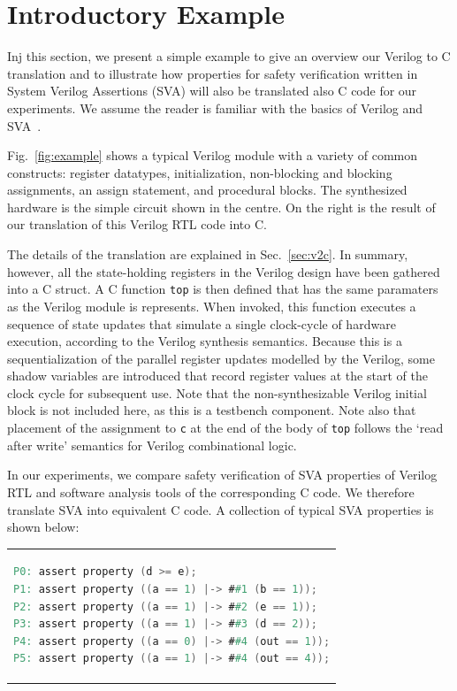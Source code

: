 \section{Introductory Example} 

Inj this section, we present a simple example to give an overview our Verilog to C translation and to illustrate how properties for safety verification written in System Verilog Assertions (SVA) will also be translated also C code for our experiments. We assume the reader is familiar with the basics of Verilog and SVA~\cite{verilog}. 

Fig.~\ref{fig:example} shows a typical Verilog module with a variety of common constructs: register datatypes, initialization, non-blocking and blocking assignments, an assign statement, and procedural blocks.  The synthesized hardware is the simple circuit shown in the centre.  On the right is the result of our translation of this Verilog RTL code into C.

The details of the translation are explained in Sec.~\ref{sec:v2c}. In summary, however, all the state-holding registers in the Verilog design have been gathered into a C struct. A C function \texttt{top} is then defined that has the same paramaters as the Verilog module is represents. When invoked, this function executes a sequence of state updates that simulate a single clock-cycle of hardware execution, according to the Verilog synthesis semantics. Because this is a sequentialization of the parallel register updates modelled by the Verilog, some shadow variables are introduced that record register values at the start of the clock cycle for subsequent use. Note that the non-synthesizable Verilog initial block is not included here, as this is a testbench component. Note also that placement of the assignment to \texttt{c} at the end of the body of \texttt{top} follows the `read after write' semantics for Verilog combinational logic.

In our experiments, we compare safety verification of SVA properties of Verilog RTL and software analysis tools of the corresponding C code. We therefore translate SVA into equivalent C code. A collection of typical SVA properties is shown below:

\begin{center}
\begin{tabular}[t]{@{}l@{}}
\begin{lstlisting}[mathescape=true,language=Verilog,basicstyle=\scriptsize\ttfamily]
P0: assert property (d >= e);
P1: assert property ((a == 1) |-> ##1 (b == 1));
P2: assert property ((a == 1) |-> ##2 (e == 1));
P3: assert property ((a == 1) |-> ##3 (d == 2));
P4: assert property ((a == 0) |-> ##4 (out == 1));
P5: assert property ((a == 1) |-> ##4 (out == 4));
\end{lstlisting}
\end{tabular}
\end{center}


